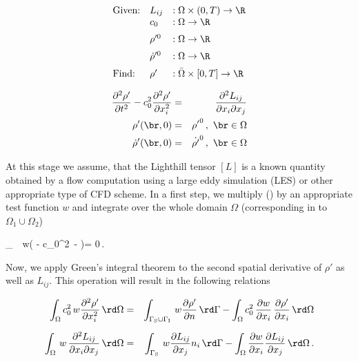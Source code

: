\documentclass[a4paper,10pt]{article}
\begin{document}
\[
\begin{array}{lll}
\hbox{Given:}& L_{ij}&: \Omega \times (0,T) \rightarrow {\R}\\
&c_0&: \Omega  \rightarrow {\R}\\[2mm]
&\rho'^0&: \Omega  \rightarrow {\R}\\[2mm]
&\dot \rho'^0&: \Omega  \rightarrow {\R}\\[2mm]
\hbox{Find:} &\rho'&: \bar{\Omega} \times [0,T] \rightarrow
{\R}
\end{array}
\]
\vspace*{-4mm}

\begin{center}
\begin{eqnarray}
\label{eq:strongF}
\frac{\partial^2 \rho'}{\partial t^2} - c_0^2  \frac{\partial^2 \rho'}{\partial x_i^2} 
&=& \frac{\partial^2 L_{ij}}{\partial x_i \partial x_j}\\
\rho'(\br,0) &=& {\rho'}^0 \, , \ \br \in \Omega \nonumber \\
\dot \rho' (\br,0) &=& \dot {\rho'}^0 \, , \ \br \in \Omega \nonumber 
\end{eqnarray}
\end{center}

\noindent
At  this stage  we assume,  that  the Lighthill  tensor $[L]$  is a  known
quantity  obtained by  a flow  computation using  a large  eddy simulation
(LES)  or other  appropriate  type of  CFD  scheme. In  a  first step,  we
multiply () by an appropriate test function $w$ and integrate
over the  whole domain $\Omega$ (corresponding  in 
to $\Omega_1 \cup \Omega_2$)

\int\limits_\Omega \,
\, w\left(  -
    c_0^2\, -  \right)\rd\Omega = 0\,.
\ee

\noindent
Now, we apply Green's integral theorem to the second spatial derivative of
$\rho'$ as well  as $L_{ij}$. This operation will  result in the following
relations

\begin{eqnarray}
\label{eq:Green1}
\int_\Omega c_0^2\, w  \frac{\partial^2 \rho'}{\partial x_i^2} \, \rd \Omega &=&
\int_{\Gamma_{\rm S} \cup \Gamma_{\rm I}}\, w \frac{\partial \rho'}{\partial n}\, \rd \Gamma
- \int_\Omega c_0^2\, \frac{\partial w}{\partial x_i} \, \frac{\partial
  \rho'}{\partial x_i} \, \rd \Omega \\[2mm] 
\label{eq:Green2}
\int_\Omega \, w\, \frac{\partial^2 L_{ij}}{\partial x_i \partial x_j} \, \rd \Omega &=&
\int_{\Gamma_{\rm S}}\, w \frac{\partial L_{ij}}{\partial x_j} n_i\, \rd \Gamma
- \int_\Omega \frac{\partial w}{\partial x_i} \frac{\partial
  L_{ij}}{\partial x_j}\, \rd \Omega\,. 
\end{eqnarray}
\end{document}
